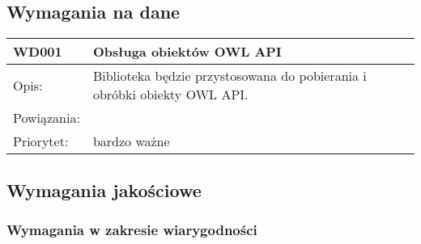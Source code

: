 \subsection{Wymagania na dane}


\begin{center}

\begin{tabular}{|m{3cm}|m{9cm}|} \hline

WD001 & Obsługa obiektów OWL API \\ \hline
Opis: & Biblioteka będzie przystosowana do pobierania i obróbki obiekty OWL API. \\ \hline
Powiązania: &  \\ \hline
Priorytet: &  bardzo ważne \\ \hline

\end{tabular}

\end{center}

\subsection{Wymagania jakościowe}


\subsubsection{Wymagania w zakresie wiarygodności}



